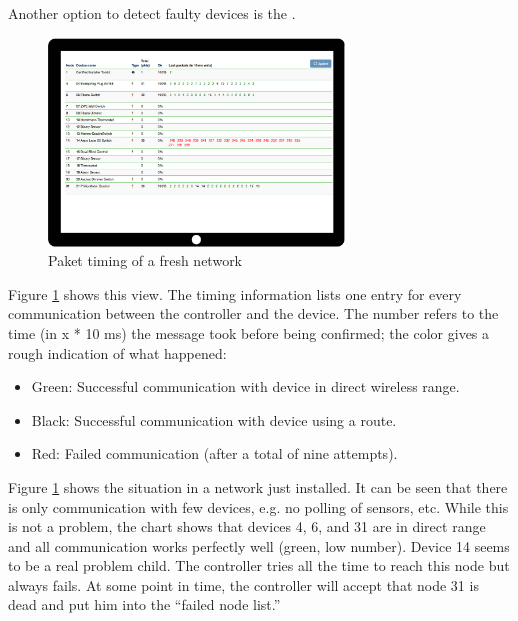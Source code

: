 Another option to detect faulty devices is the . 

\begin{figure}
\begin{center}
\includegraphics[width=0.7\textwidth]{pngs/cap8/c5timinginfo1.pdf}
\caption{Paket timing of a fresh \zwave network}
\label{c5:snifferfresh}
\end{center}
\end{figure}

Figure \ref{c5:snifferfresh} shows this view. The timing information lists one entry for 
every communication between the controller and the device. The number refers to the time 
(in x * 10 ms) the message took before being confirmed; the color gives a rough 
indication of what happened:

\begin{itemize}
\item Green: Successful communication with device in direct wireless range.
\item Black: Successful communication with device using a route.
\item Red: Failed communication (after a total of nine attempts).
\end{itemize}

Figure \ref{c5:snifferfresh} shows the situation in a network just installed. It can be 
seen that there is only communication with few devices, e.g. no polling of sensors, etc. 
While this is not a problem, the chart shows that devices 4, 6, and 31 are in direct 
range and all communication works perfectly well (green, low number). Device 14 seems 
to be a real problem child. The controller tries all the time to reach this node but 
always fails. At some point in time, the controller will accept that node 31 is dead 
and put him into the ``failed node list.''

